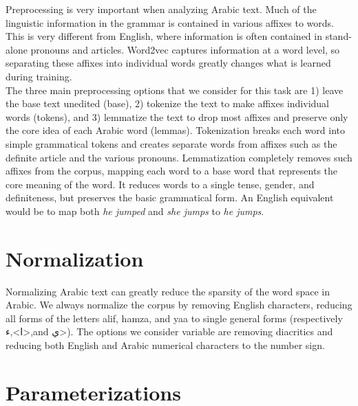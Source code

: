 Preprocessing is very important when analyzing Arabic text. Much of the linguistic information in the grammar is contained in various affixes to words. This is very different from English, where information is often contained in stand-alone pronouns and articles. Word2vec captures information at a word level, so separating these affixes into individual words greatly changes what is learned during training.
\\
The three main preprocessing options that we consider for this task are 1) leave the base text unedited (base), 2) tokenize the text to make affixes individual words (tokens), and 3) lemmatize the text to drop most affixes and preserve only the core idea of each Arabic word (lemmas). Tokenization breaks each word into simple grammatical tokens and creates separate words from affixes such as the definite article and the various pronouns. Lemmatization completely removes such affixes from the corpus, mapping each word to a base word that represents the core meaning of the word. It reduces words to a single tense, gender, and definiteness, but preserves the basic grammatical form. An English equivalent would be to map both \textit{he jumped} and \textit{she jumps} to \textit{he jumps}.

\section{Normalization}

Normalizing Arabic text can greatly reduce the sparsity of the word space in Arabic. We always normalize the corpus by removing English characters, reducing all forms of the letters alif, hamza, and yaa to single general forms (respectively \<ا>,\<ء>,and \<ي>).  The options we consider variable are removing diacritics and reducing both English and Arabic numerical characters to the number sign.

\section{Parameterizations}

